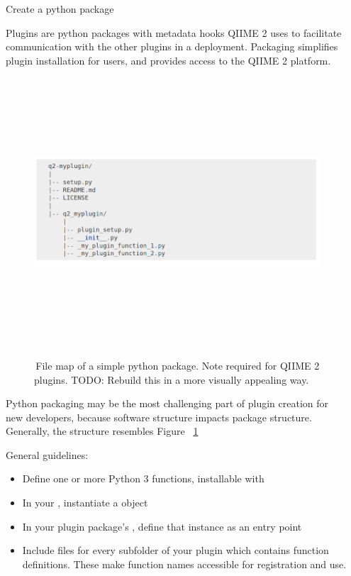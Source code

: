 \documentclass[final]{beamer}
\newlength{\sepwidth}
\newlength{\colwidth}
\newcommand{\separatorcolumn}{\begin{column}{\sepwidth}\end{column}}
\begin{document}
\begin{frame}[t]
\begin{columns}[t]
\separatorcolumn

\begin{column}{\colwidth}

  \begin{block}{Create a python package}

    Plugins are python packages with metadata hooks QIIME 2 uses to facilitate
    communication with the other plugins in a deployment. Packaging
    simplifies plugin installation for users, and provides access to the QIIME 2 platform.

    \begin{figure}[tph!]
      {\includegraphics[height=10cm]{assets/package_structure}}
      \caption{\,File map of a simple python package. Note  required for QIIME 2 plugins.
      TODO: Rebuild this in a more visually appealing way.}
      \label{fig:packageStructure}
    \end{figure}

    \begin{tcolorbox}
    [width=\textwidth, colframe=blue]
    {Python packaging may be the most challenging part of plugin creation
    for new developers, because software structure impacts package structure.
    Generally, the structure resembles Figure ~\ref{fig:packageStructure}}
    \end{tcolorbox}

    General guidelines:
    \begin{itemize}
      \item Define one or more Python 3 functions, installable with 
      \item In your , instantiate a  object
      \item In your plugin package's , define that instance as an entry point
      \item Include  files for every subfolder of your plugin which
      contains function definitions. These make function names accessible for registration and use.
    \end{itemize}
  \end{block}


\end{column}
\end{columns}
\end{frame}
\end{document}
